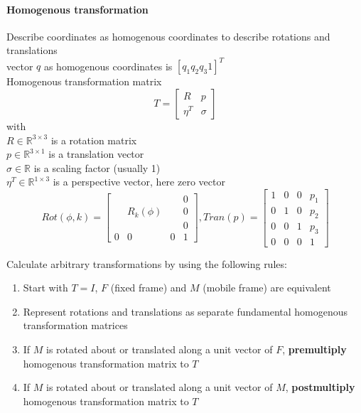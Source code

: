 \documentclass[12pt]{article}
\newcommand{\R}{\mathbb{R}}
\begin{document}
	\paragraph{Homogenous transformation} Describe coordinates as homogenous coordinates to describe rotations and translations\\
	vector $q$ as homogenous coordinates is $[q_{1} q_{2} q_{3} 1]^T$\\
	Homogenous transformation matrix
	\begin{equation}
	T = 
	\begin{bmatrix}
	R & p\\
	\eta^T & \sigma
	\end{bmatrix}
	\end{equation}
	with\\
	$R \in \R^{3 \times 3}$ is a rotation matrix\\
	$p \in \R^{3 \times 1}$ is a translation vector\\
	$\sigma \in \R$ is a scaling factor (usually 1)\\
	$\eta^T \in \R^{1 \times 3}$ is a perspective vector, here zero vector	\begin{equation}
	Rot(\phi, k) = 
	\begin{bmatrix}
	& & & 0\\
	& R_{k}(\phi) & & 0\\
	& & & 0\\
	0 & 0 & 0 & 1
	\end{bmatrix}, 
	Tran(p) = 
	\begin{bmatrix}
	1 & 0 & 0 & p_{1}\\
	0 & 1 & 0 & p_{2}\\
	0 & 0 & 1 & p_{3}\\
	0 & 0 & 0 & 1
	\end{bmatrix}
	\end{equation}
	
	Calculate arbitrary transformations by using the following rules:
	\begin{enumerate}
		\item Start with $T = I$, $F$ (fixed frame) and $M$ (mobile frame) are equivalent
		\item Represent rotations and translations as separate fundamental homogenous transformation matrices
		\item If $M$ is rotated about or translated along a unit vector of $F$, \textbf{premultiply} homogenous transformation matrix to $T$
		\item If $M$ is rotated about or translated along a unit vector of $M$, \textbf{postmultiply} homogenous transformation matrix to $T$
	\end{enumerate}
	
\end{document}
